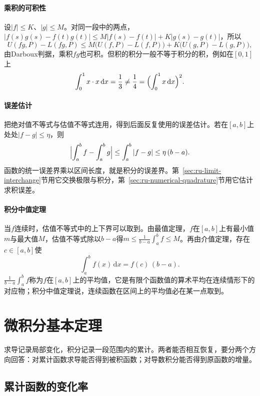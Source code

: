 \paragraph{乘积的可积性}
设$|f|\leq K$、$|g|\leq M$。对同一段中的两点，$|f(s)g(s)-f(t)g(t)|\leq M|f(s)-f(t)|+K|g(s)-g(t)|$，所以
\[
 U(fg,P)-L(fg,P)\leq M\bigl(U(f,P)-L(f,P)\bigr)+K\bigl(U(g,P)-L(g,P)\bigr),
\]
由Darboux判据，乘积$fg$也可积。但积的积分一般不等于积分的积，例如在$[0,1]$上
\[
 \int_0^1x\cdot x\,\mathrm dx=\frac13\neq\frac14=\Bigl(\int_0^1x\,\mathrm dx\Bigr)^2.
\]

\paragraph{误差估计}
把绝对值不等式与估值不等式连用，得到后面反复使用的误差估计。若在$[a,b]$上处处$|f-g|\leq\eta$，则
\[
 \Bigl|\int_a^bf-\int_a^bg\Bigr|\leq\int_a^b|f-g|\leq\eta\,(b-a).
\]
函数的统一误差界乘以区间长度，就是积分的误差界。第~\ref{sec:ru-limit-interchange}节用它交换极限与积分，第~\ref{sec:ru-numerical-quadrature}节用它估计求积误差。

\paragraph{积分中值定理}
当$f$连续时，估值不等式中的上下界可以取到。由最值定理，$f$在$[a,b]$上有最小值$m$与最大值$M$，估值不等式除以$b-a$得$m\leq\frac1{b-a}\int_a^bf\leq M$。再由介值定理，存在$c\in[a,b]$使
\[
 \int_a^bf(x)\,\mathrm dx=f(c)\,(b-a).
\]
$\frac1{b-a}\int_a^bf$称为$f$在$[a,b]$上的平均值，它是有限个函数值的算术平均在连续情形下的对应物；积分中值定理说，连续函数在区间上的平均值必在某一点取到。
\section{微积分基本定理}
\label{sec:ru-fundamental-theorem}

求导记录局部变化，积分记录一段范围内的累计。两者能否相互恢复，要分两个方向回答：对累计函数求导能否得到被积函数；对导数积分能否得到原函数的增量。

\subsection{累计函数的变化率}
\label{sec:ru-accumulation-derivative}

